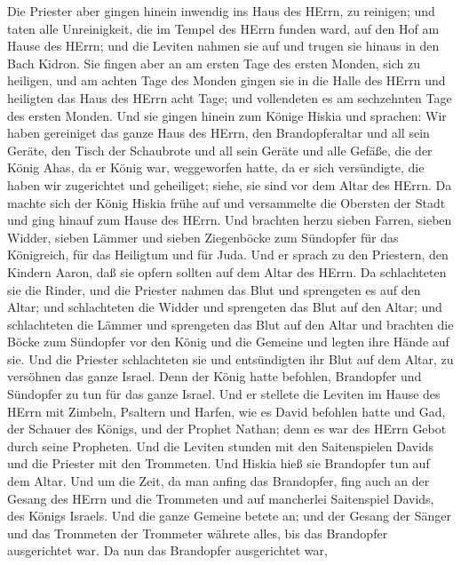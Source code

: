  Die Priester aber gingen hinein inwendig ins Haus des
HErrn, zu reinigen; und taten alle Unreinigkeit, die im Tempel des HErrn
funden ward, auf den Hof am Hause des HErrn; und die Leviten nahmen sie
auf und trugen sie hinaus in den Bach Kidron.  Sie fingen
aber an am ersten Tage des ersten Monden, sich zu heiligen, und am
achten Tage des Monden gingen sie in die Halle des HErrn und heiligten
das Haus des HErrn acht Tage; und vollendeten es am sechzehnten Tage des
ersten Monden.  Und sie gingen hinein zum Könige Hiskia und
sprachen: Wir haben gereiniget das ganze Haus des HErrn, den
Brandopferaltar und all sein Geräte, den Tisch der Schaubrote und all
sein Geräte  und alle Gefäße, die der König Ahas, da er
König war, weggeworfen hatte, da er sich versündigte, die haben wir
zugerichtet und geheiliget; siehe, sie sind vor dem Altar des HErrn.
 Da machte sich der König Hiskia frühe auf und versammelte
die Obersten der Stadt und ging hinauf zum Hause des HErrn.
 Und brachten herzu sieben Farren, sieben Widder, sieben
Lämmer und sieben Ziegenböcke zum Sündopfer für das Königreich, für das
Heiligtum und für Juda. Und er sprach zu den Priestern, den Kindern
Aaron, daß sie opfern sollten auf dem Altar des HErrn.  Da
schlachteten sie die Rinder, und die Priester nahmen das Blut und
sprengeten es auf den Altar; und schlachteten die Widder und sprengeten
das Blut auf den Altar; und schlachteten die Lämmer und sprengeten das
Blut auf den Altar  und brachten die Böcke zum Sündopfer
vor den König und die Gemeine und legten ihre Hände auf sie.
 Und die Priester schlachteten sie und entsündigten ihr
Blut auf dem Altar, zu versöhnen das ganze Israel. Denn der König hatte
befohlen, Brandopfer und Sündopfer zu tun für das ganze Israel.
 Und er stellete die Leviten im Hause des HErrn mit
Zimbeln, Psaltern und Harfen, wie es David befohlen hatte und Gad, der
Schauer des Königs, und der Prophet Nathan; denn es war des HErrn Gebot
durch seine Propheten.  Und die Leviten stunden mit den
Saitenspielen Davids und die Priester mit den Trommeten. 
Und Hiskia hieß sie Brandopfer tun auf dem Altar. Und um die Zeit, da
man anfing das Brandopfer, fing auch an der Gesang des HErrn und die
Trommeten und auf mancherlei Saitenspiel Davids, des Königs Israels.
 Und die ganze Gemeine betete an; und der Gesang der Sänger
und das Trommeten der Trommeter währete alles, bis das Brandopfer
ausgerichtet war.  Da nun das Brandopfer ausgerichtet war,
